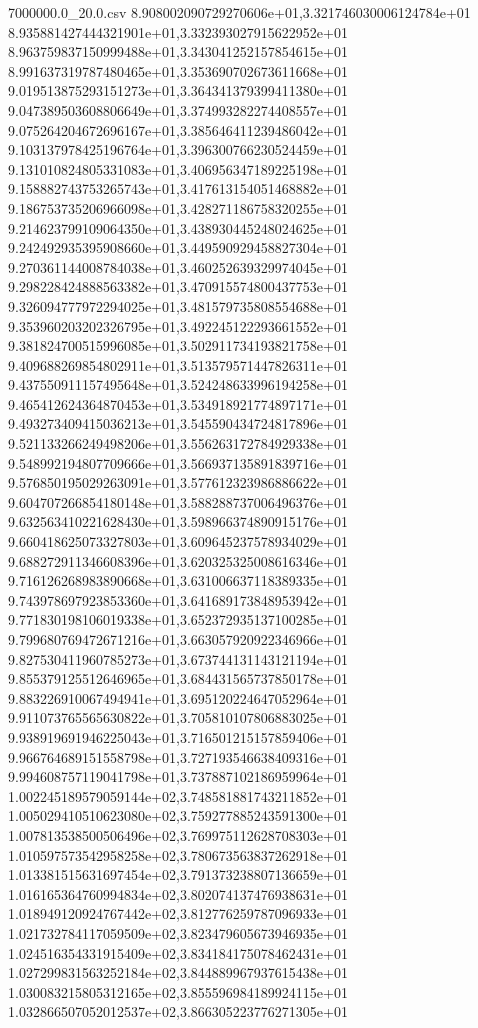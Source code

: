 \begin{filecontents*}{7000000.0_20.0.csv}
8.908002090729270606e+01,3.321746030006124784e+01
8.935881427444321901e+01,3.332393027915622952e+01
8.963759837150999488e+01,3.343041252157854615e+01
8.991637319787480465e+01,3.353690702673611668e+01
9.019513875293151273e+01,3.364341379399411380e+01
9.047389503608806649e+01,3.374993282274408557e+01
9.075264204672696167e+01,3.385646411239486042e+01
9.103137978425196764e+01,3.396300766230524459e+01
9.131010824805331083e+01,3.406956347189225198e+01
9.158882743753265743e+01,3.417613154051468882e+01
9.186753735206966098e+01,3.428271186758320255e+01
9.214623799109064350e+01,3.438930445248024625e+01
9.242492935395908660e+01,3.449590929458827304e+01
9.270361144008784038e+01,3.460252639329974045e+01
9.298228424888563382e+01,3.470915574800437753e+01
9.326094777972294025e+01,3.481579735808554688e+01
9.353960203202326795e+01,3.492245122293661552e+01
9.381824700515996085e+01,3.502911734193821758e+01
9.409688269854802911e+01,3.513579571447826311e+01
9.437550911157495648e+01,3.524248633996194258e+01
9.465412624364870453e+01,3.534918921774897171e+01
9.493273409415036213e+01,3.545590434724817896e+01
9.521133266249498206e+01,3.556263172784929338e+01
9.548992194807709666e+01,3.566937135891839716e+01
9.576850195029263091e+01,3.577612323986886622e+01
9.604707266854180148e+01,3.588288737006496376e+01
9.632563410221628430e+01,3.598966374890915176e+01
9.660418625073327803e+01,3.609645237578934029e+01
9.688272911346608396e+01,3.620325325008616346e+01
9.716126268983890668e+01,3.631006637118389335e+01
9.743978697923853360e+01,3.641689173848953942e+01
9.771830198106019338e+01,3.652372935137100285e+01
9.799680769472671216e+01,3.663057920922346966e+01
9.827530411960785273e+01,3.673744131143121194e+01
9.855379125512646965e+01,3.684431565737850178e+01
9.883226910067494941e+01,3.695120224647052964e+01
9.911073765565630822e+01,3.705810107806883025e+01
9.938919691946225043e+01,3.716501215157859406e+01
9.966764689151558798e+01,3.727193546638409316e+01
9.994608757119041798e+01,3.737887102186959964e+01
1.002245189579059144e+02,3.748581881743211852e+01
1.005029410510623080e+02,3.759277885243591300e+01
1.007813538500506496e+02,3.769975112628708303e+01
1.010597573542958258e+02,3.780673563837262918e+01
1.013381515631697454e+02,3.791373238807136659e+01
1.016165364760994834e+02,3.802074137476938631e+01
1.018949120924767442e+02,3.812776259787096933e+01
1.021732784117059509e+02,3.823479605673946935e+01
1.024516354331915409e+02,3.834184175078462431e+01
1.027299831563252184e+02,3.844889967937615438e+01
1.030083215805312165e+02,3.855596984189924115e+01
1.032866507052012537e+02,3.866305223776271305e+01

\end{filecontents*}
